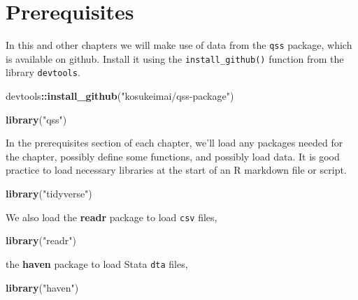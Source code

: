\documentclass[]{book}
\newenvironment{Shaded}{\begin{snugshade}}{\end{snugshade}}
\newcommand{\KeywordTok}[1]{\textcolor[rgb]{0.13,0.29,0.53}{\textbf{#1}}}
\newcommand{\NormalTok}[1]{#1}
\newcommand{\OperatorTok}[1]{\textcolor[rgb]{0.81,0.36,0.00}{\textbf{#1}}}
\newcommand{\StringTok}[1]{\textcolor[rgb]{0.31,0.60,0.02}{#1}}
\theoremstyle{definition}
\theoremstyle{definition}
\theoremstyle{definition}
\theoremstyle{remark}
\begin{document}
\hypertarget{prerequisites}{%
\section*{Prerequisites}\label{prerequisites}}

In this and other chapters we will make use of data from the
\texttt{qss} package, which is available on github. Install it using the
\texttt{install\_github()} function from the library \texttt{devtools}.

\begin{Shaded}
\begin{Highlighting}[]
\NormalTok{devtools}\OperatorTok{::}\KeywordTok{install_github}\NormalTok{(}\StringTok{"kosukeimai/qss-package"}\NormalTok{)}
\end{Highlighting}
\end{Shaded}

\begin{Shaded}
\begin{Highlighting}[]
\KeywordTok{library}\NormalTok{(}\StringTok{"qss"}\NormalTok{)}
\end{Highlighting}
\end{Shaded}

In the prerequisites section of each chapter, we'll load any packages
needed for the chapter, possibly define some functions, and possibly
load data. It is good practice to load necessary libraries at the start
of an R markdown file or script.

\begin{Shaded}
\begin{Highlighting}[]
\KeywordTok{library}\NormalTok{(}\StringTok{"tidyverse"}\NormalTok{)}
\end{Highlighting}
\end{Shaded}

We also load the \textbf{readr} package to load \texttt{csv} files,

\begin{Shaded}
\begin{Highlighting}[]
\KeywordTok{library}\NormalTok{(}\StringTok{"readr"}\NormalTok{)}
\end{Highlighting}
\end{Shaded}

the \textbf{haven} package to load Stata \texttt{dta} files,

\begin{Shaded}
\begin{Highlighting}[]
\KeywordTok{library}\NormalTok{(}\StringTok{"haven"}\NormalTok{)}
\end{Highlighting}
\end{Shaded}
\end{document}
